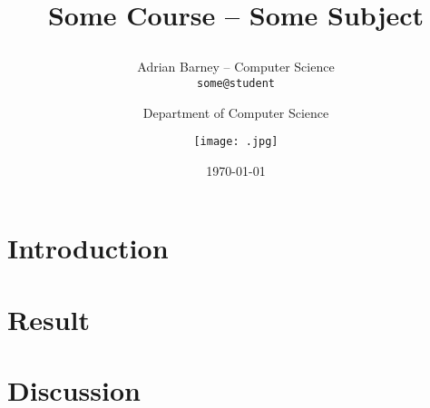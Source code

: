 \documentclass[12pt]{article}
\title{Some Course -- Some Subject
\author{
Adrian Barney -- Computer Science \\ {\tt some@student} \and
Department of Computer Science \and
\texttt{[image: .jpg]}}
}
\date{\today}
\begin{document}
\maketitle
\thispagestyle{empty}
\newpage

\thispagestyle{empty}
\begin{abstract}
    \noindent
\end{abstract}
\newpage

\tableofcontents
\thispagestyle{empty}
\newpage

\setcounter{page}{1}

\section{Introduction}

\section{Result}

\section{Discussion}

\newpage
\printbibliography
\end{document}
